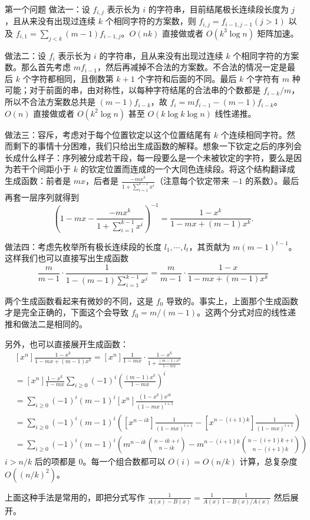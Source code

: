 \begin{frame}{第一个问题}
    做法一：设 $f_{i,j}$ 表示长为 $i$ 的字符串，目前结尾极长连续段长度为 $j$，且从来没有出现过连续 $k$ 个相同字符的方案数，则 $f_{i,j}=f_{i-1,j-1}(j>1)$ 以及 $f_{i,1}=\sum_{j<k} (m-1)f_{i-1,j}$。$O(nk)$ 直接做或者 $O(k^3\log n)$ 矩阵加速。

    做法二：设 $f_i$ 表示长为 $i$ 的字符串，且从来没有出现过连续 $k$ 个相同字符的方案数。那么首先考虑 $mf_{i-1}$，然后再减掉不合法的方案数。不合法的情况一定是最后 $k$ 个字符都相同，且倒数第 $k+1$ 个字符和后面的不同。最后 $k$ 个字符有 $m$ 种可能；对于前面的串，由对称性，以每种字符结尾的合法串的个数都是 $f_{i-k}/m$，所以不合法方案数总共是 $(m-1)f_{i-k}$，故 $f_i=mf_{i-1}-(m-1)f_{i-k}$。$O(n)$ 直接做或者 $O(k^2\log n)$ 甚至 $O(k\log k\log n)$ 线性递推。
\end{frame}
\begin{frame}
    做法三：容斥，考虑对于每个位置钦定以这个位置结尾有 $k$ 个连续相同字符。然而剩下的事情十分困难，我们只给出生成函数的解释。想象一下钦定之后的序列会长成什么样子：序列被分成若干段，每一段要么是一个未被钦定的字符，要么是因为若干个间距小于 $k$ 的钦定位置而连成的一个大同色连续段。将这个结构翻译成生成函数：前者是 $mx$，后者是 $\frac{-mx^k}{1+\sum_{i=1}^{k-1}x^i}$（注意每个钦定带来 $-1$ 的系数）。最后再套一层序列就得到
    $$
    \left(1-mx-\frac{-mx^k}{1+\sum_{i=1}^{k-1}x^i}\right)^{-1}=\frac{1-x^k}{1-mx+(m-1)x^k}.
    $$

    做法四：考虑先枚举所有极长连续段的长度 $l_1,\cdots,l_t$，其贡献为 $m(m-1)^{t-1}$。这样我们也可以直接写出生成函数 
    $$
    \frac{m}{m-1}\cdot \frac{1}{1-(m-1)\sum_{i=1}^{k-1}x^i}=\frac{m}{m-1}\cdot \frac{1-x}{1-mx+(m-1)x^k}
    $$

    两个生成函数看起来有微妙的不同，这是 $f_0$ 导致的。事实上，上面那个生成函数才是完全正确的，下面这个会导致 $f_0=m/(m-1)$。这两个分式对应的线性递推和做法二是相同的。
\end{frame}
\begin{frame}
    另外，也可以直接展开生成函数：
    $$
    \begin{aligned}
    &[x^n]\frac{1-x^k}{1-mx+(m-1)x^k}=[x^n]\frac{1}{1-mx}\cdot \frac{1-x^k}{1+\frac{(m-1)x^k}{1-mx}}\\
    &=[x^n]\frac{1-x^k}{1-mx}\sum_{i\ge 0}(-1)^i\left(\frac{(m-1)x^k}{1-mx}\right)^i\\
    &=\sum_{i\ge 0}(-1)^i(m-1)^i[x^n]\frac{(1-x^k)x^{ik}}{(1-mx)^{i+1}}\\
    &=\sum_{i\ge 0}(-1)^i(m-1)^i\left([x^{n-ik}]\frac{1}{(1-mx)^{i+1}}-[x^{n-(i+1)k}]\frac{1}{(1-mx)^{i+1}}\right)\\
    &=\sum_{i\ge 0}(-1)^i(m-1)^i\left(m^{n-ik}\binom{n-ik+i}{n-ik}-m^{n-(i+1)k}\binom{n-(i+1)k+i}{n-(i+1)k}\right)
    \end{aligned}
    $$
    $i>n/k$ 后的项都是 $0$。每一个组合数都可以 $O(i)=O(n/k)$ 计算，总复杂度 $O((n/k)^2)$。

    上面这种手法是常用的，即把分式写作 $\frac{1}{A(x)-B(x)}=\frac{1}{A(x)}\frac{1}{1-B(x)/A(x)}$ 然后展开。
\end{frame}
